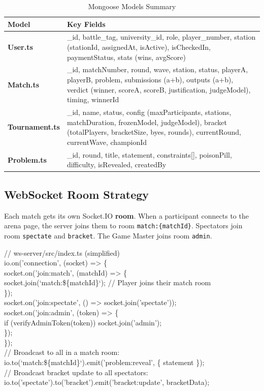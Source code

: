 \documentclass[11pt, a4paper]{article}
\begin{document}
\begin{table}[H]
\centering
\small\renewcommand{\arraystretch}{1.25}
\begin{tabularx}{\textwidth}{>{\bfseries}l X}
\toprule
Model & Key Fields \\
\midrule
User.ts       & \_id, battle\_tag, university\_id, role, player\_number, station (stationId, assignedAt, isActive), isCheckedIn, paymentStatus, stats (wins, avgScore) \\
Match.ts      & \_id, matchNumber, round, wave, station, status, playerA, playerB, problem, submissions (a+b), outputs (a+b), verdict (winner, scoreA, scoreB, justification, judgeModel), timing, winnerId \\
Tournament.ts & \_id, name, status, config (maxParticipants, stations, matchDuration, frozenModel, judgeModel), bracket (totalPlayers, bracketSize, byes, rounds), currentRound, currentWave, championId \\
Problem.ts    & \_id, round, title, statement, constraints[], poisonPill, difficulty, isRevealed, createdBy \\
\bottomrule
\end{tabularx}
\caption{Mongoose Models Summary}
\end{table}

\subsection{WebSocket Room Strategy}

Each match gets its own Socket.IO \textbf{room}. When a participant connects to the arena page, the server joins them to room \texttt{match:\{matchId\}}. Spectators join room \texttt{spectate} and \texttt{bracket}. The Game Master joins room \texttt{admin}.

\begin{tcolorbox}[codebox]
\small\color{white}\ttfamily
\textcolor{codegreen}{// ws-server/src/index.ts (simplified)}\\
io.on('connection', (socket) => \{\\
\quad socket.on('join:match', (matchId) => \{\\
\quad\quad socket.join(`match:\$\{matchId\}`); \textcolor{codegreen}{// Player joins their match room}\\
\quad \});\\
\quad socket.on('join:spectate', () => socket.join('spectate'));\\
\quad socket.on('join:admin', (token) => \{\\
\quad\quad if (verifyAdminToken(token)) socket.join('admin');\\
\quad \});\\
\});\\
\textcolor{codegreen}{// Broadcast to all in a match room:}\\
io.to(`match:\$\{matchId\}`).emit('problem:reveal', \{ statement \});\\
\textcolor{codegreen}{// Broadcast bracket update to all spectators:}\\
io.to('spectate').to('bracket').emit('bracket:update', bracketData);
\end{tcolorbox}
\end{document}
